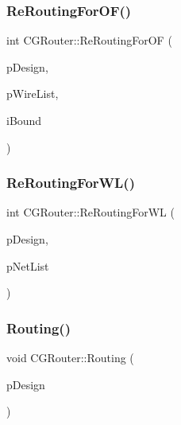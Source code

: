 \subsubsection{\texorpdfstring{ReRoutingForOF()}{ReRoutingForOF()}\hspace{0.1cm}{\footnotesize\ttfamily [3/3]}}
{\footnotesize\ttfamily int C\+G\+Router\+::\+Re\+Routing\+For\+OF (\begin{DoxyParamCaption}\item[{\mbox{\hyperlink{classCDesign}{C\+Design}} $\ast$}]{p\+Design,  }\item[{vector$<$ \mbox{\hyperlink{classCWire}{C\+Wire}} $\ast$ $>$ $\ast$}]{p\+Wire\+List,  }\item[{int}]{i\+Bound }\end{DoxyParamCaption})\hspace{0.3cm}{\ttfamily [static]}}

\mbox{\label{classCGRouter_a35bb814cd4191e640f1aecde4e5726ea}} 
\subsubsection{\texorpdfstring{ReRoutingForWL()}{ReRoutingForWL()}}
{\footnotesize\ttfamily int C\+G\+Router\+::\+Re\+Routing\+For\+WL (\begin{DoxyParamCaption}\item[{\mbox{\hyperlink{classCDesign}{C\+Design}} $\ast$}]{p\+Design,  }\item[{vector$<$ \mbox{\hyperlink{classCNet}{C\+Net}} $\ast$ $>$ $\ast$}]{p\+Net\+List }\end{DoxyParamCaption})\hspace{0.3cm}{\ttfamily [static]}}

\mbox{\label{classCGRouter_a4c455bc1400005226fcb3a04639c79c7}} 
\subsubsection{\texorpdfstring{Routing()}{Routing()}}
{\footnotesize\ttfamily void C\+G\+Router\+::\+Routing (\begin{DoxyParamCaption}\item[{\mbox{\hyperlink{classCDesign}{C\+Design}} $\ast$}]{p\+Design }\end{DoxyParamCaption})\hspace{0.3cm}{\ttfamily [static]}}

